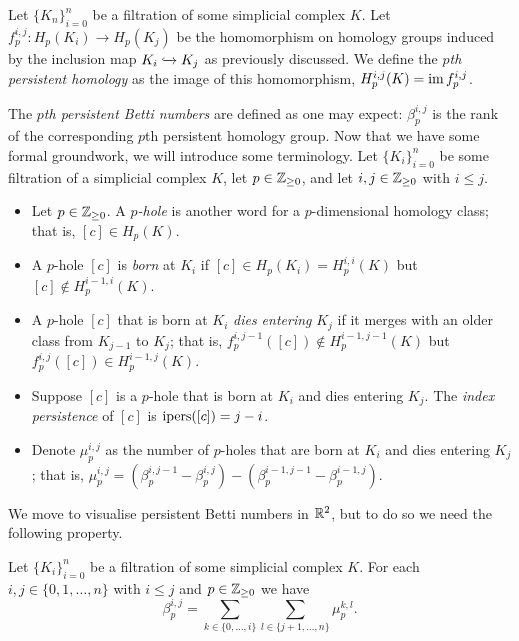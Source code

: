 \begin{definition}
  Let $\{K_n\}_{i=0}^n$ be a filtration of some simplicial complex $K$. Let $f_p^{i,j}: H_p(K_i) \to H_p(K_j)$ be the homomorphism on homology groups induced by the inclusion map $K_i \xhookrightarrow{} K_j$ as previously discussed. We define the \emph{$p$th persistent homology} as the image of this homomorphism, $H_p^{i,j}(K)=\operatorname*{im} f_p^{i,j}$.
\end{definition}

The \emph{$p$th persistent Betti numbers} are defined as one may expect: $\beta_p^{i,j}$ is the rank of the corresponding $p$th persistent homology group. Now that we have some formal groundwork, we will introduce some terminology. Let $\{K_i\}_{i=0}^n$ be some filtration of a simplicial complex $K$, let $p \in \mathbb{Z}_{\geq 0}$, and let $i, j \in \mathbb{Z}_{\geq 0}$ with $i \leq j$.

\begin{itemize}
  \item Let $p \in \mathbb{Z}_{\geq 0}$. A \emph{$p$-hole} is another word for a $p$-dimensional homology class; that is, $[c] \in H_p(K)$.
  \item A $p$-hole $[c]$ is \emph{born} at $K_i$ if $[c] \in H_p(K_i)=H_p^{i,i}(K)$ but $[c] \not\in H_p^{i-1,i}(K)$.
  \item A $p$-hole $[c]$ that is born at $K_i$ \emph{dies entering} $K_j$ if it merges with an older class from $K_{j-1}$ to $K_j$; that is, $f_p^{i,j-1} ([c]) \not\in H_p^{i-1,j-1}(K)$ but $f_p^{i,j}([c]) \in H_p^{i-1,j}(K)$.
  \item Suppose $[c]$ is a $p$-hole that is born at $K_i$ and dies entering $K_j$. The \emph{index persistence} of $[c]$ is $\operatorname*{ipers}([c]) = j - i$.
  \item Denote $\mu_p^{i,j}$ as the number of $p$-holes that are born at $K_i$ and dies entering $K_j$; that is, $\mu_p^{i,j} = (\beta_p^{i,j-1} - \beta_p^{i,j}) - (\beta_p^{i-1,j-1} - \beta_p^{i-1,j})$.
\end{itemize}

We move to visualise persistent Betti numbers in $\mathbb{R}^2$, but to do so we need the following property.

\begin{lemma}
  Let $\{K_i\}_{i=0}^n$ be a filtration of some simplicial complex $K$. For each $i, j \in \{0, 1, \ldots, n\}$ with $i \leq j$ and $p \in \mathbb{Z}_{\geq 0}$ we have
  \[\beta^{i,j}_p = \sum_{k \in \{0, \ldots, i\}} \sum_{l \in \{j+1, \ldots, n\}} \mu_p^{k,l}.\]
\end{lemma}

